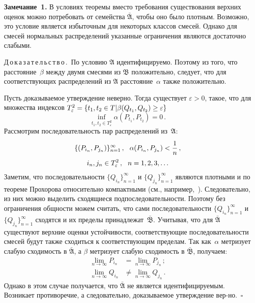 \begin{multicols}{2}
\medskip

\noindent
\textbf{Замечание~1.}
В условиях теоремы вместо требования существования верхних оценок
можно потребовать от семейства $\bar{\mathfrak{A}}$, чтобы оно было
плотным. Возможно, это условие является избыточным для некоторых
классов смесей. Однако для смесей нормальных распределений указанные
ограничения являются достаточно слабыми.

\medskip

\noindent
Д\,о\,к\,а\,з\,а\,т\,е\,л\,ь\,с\,т\,в\,о\,.\ 
По условию $\mathfrak{A}$ идентифицируемо. Поэтому из того, что
расстояние~$\beta$ между двумя смесями из $\mathfrak{B}$
положительно, следует, что для соответствующих распределений из
$\mathfrak{A}$ расстояние~$\alpha$ также положительно. 

Пусть
доказываемое утверждение неверно. Тогда существует $\varepsilon >
0$, такое, что для множества индексов
$T^2_\varepsilon \hm= \left\{
 t_1, t_2 \hm\in T|
\beta(Q_{t_1}, Q_{t_2})\hm \ge \varepsilon
\right\}$
$$ \inf\limits_{t_1, t_2 \in T^2_\varepsilon}
 \alpha(P_{t_1}, P_{t_2}) =0\,.
$$
Рассмотрим последовательность пар распределений из~$\mathfrak{A}$:
\begin{multline*}
\{(P_{i_n}, P_{j_n})\}^{\infty}_{n=1}\,, \ \  \alpha(P_{i_n}, P_{j_n})
< \displaystyle\frac{\displaystyle 1\mathstrut}{\displaystyle n\mathstrut}\,, \\  i_n, j_n \in T^2_\varepsilon\,, \ \ n =
1,2,3,\ldots
\end{multline*}
Заметим, что последовательности $\{ Q_{i_n} \}^{\infty}_{n=1}$ и $\{
Q_{j_n} \}^{\infty}_{n=1}$ являются плотными и по теореме Прохорова
относительно компактными (см., например,~\cite{bilingRus}).
Следовательно, из них можно выделить сходящиеся
подпоследовательности. Поэтому без ограничения общности можем
считать, что сами последовательности   $\{ Q_{i_n}
\}^{\infty}_{n=1}$ и $\{ Q_{j_n} \}^{\infty}_{n=1}$ сходятся  и их
пределы принадлежат~$\bar{\mathfrak{B}}$. Учитывая, что для
$\bar{\mathfrak{A}}$ существуют верхние оценки устойчивости,
соответствующие последовательности смесей будут также сходиться к
соответствующим пределам. Так как~$\alpha$ метризует слабую сходимость
в $\bar{\mathfrak{A}}$, а $\beta$ метризует слабую сходимость в
$\bar{\mathfrak{B}}$, получаем:
\begin{align*}
\lim_{n\rightarrow\infty} P_{i_n} &= \lim_{n\rightarrow\infty} P_{j_n}\,; \\
\lim_{n\rightarrow\infty} Q_{i_n} & \neq \lim_{n\rightarrow\infty} Q_{j_n}\,. 
\end{align*}
Однако в этом случае получается, что $\bar{\mathfrak{A}}$ не
является идентифицируемым. Возникает противоречие, а следовательно,
доказываемое утверждение вер-\linebreak но.\hfill~$\square$


\end{multicols}
